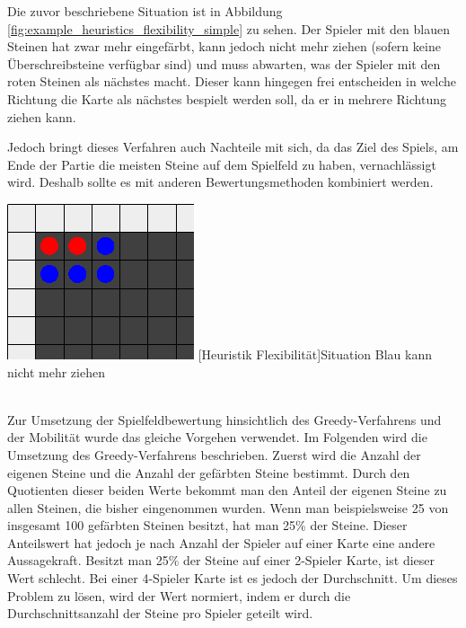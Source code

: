 \documentclass[12pt,a4paper,bibliography=totocnumbered,listof=totocnumbered]{article}
\begin{document}
Die zuvor beschriebene Situation ist in Abbildung \ref{fig:example_heuristics_flexibility_simple} zu sehen. Der Spieler mit den blauen Steinen hat zwar mehr eingefärbt, kann jedoch nicht mehr ziehen (sofern keine Überschreibsteine verfügbar sind) und muss abwarten, was der Spieler mit den roten Steinen als nächstes macht. Dieser kann hingegen frei entscheiden in welche Richtung die Karte als nächstes bespielt werden soll, da er in mehrere Richtung ziehen kann.

Jedoch bringt dieses Verfahren auch Nachteile mit sich, da das Ziel des Spiels, am Ende der Partie die meisten Steine auf dem Spielfeld zu haben, vernachlässigt wird. Deshalb sollte es mit anderen Bewertungsmethoden kombiniert werden.

\vspace{1em}
\begin{minipage}{\linewidth}
	\centering
	\includegraphics[width=0.3\linewidth]{pics/heuristics_flexibility_simple_v2.png}
	[Heuristik Flexibilität]{Situation Blau kann nicht mehr ziehen}
	\label{fig:example_heuristics_flexibility_simple}
\end{minipage}
\\


Zur Umsetzung der Spielfeldbewertung hinsichtlich des Greedy-Verfahrens und der Mobilität wurde das gleiche Vorgehen verwendet. Im Folgenden wird die Umsetzung des Greedy-Verfahrens beschrieben.
Zuerst wird die Anzahl der eigenen Steine und die Anzahl der gefärbten Steine bestimmt. Durch den Quotienten dieser beiden Werte bekommt man den Anteil der eigenen Steine zu allen Steinen, die bisher eingenommen wurden. Wenn man beispielsweise 25 von insgesamt 100 gefärbten Steinen besitzt, hat man 25\% der Steine. Dieser Anteilswert hat jedoch je nach Anzahl der Spieler auf einer Karte eine andere Aussagekraft. Besitzt man 25\% der Steine auf einer 2-Spieler Karte, ist dieser Wert schlecht. Bei einer 4-Spieler Karte ist es jedoch der Durchschnitt. Um dieses Problem zu lösen, wird der Wert normiert, indem er durch die Durchschnittsanzahl der Steine pro Spieler geteilt wird. 
\end{document}
